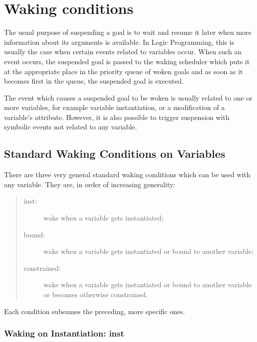 \section{Waking conditions}
The usual purpose of suspending a goal is to wait and resume it later
when more information about its arguments is available.
In Logic Programming, this is usually the case when certain events
related to variables occur.
When such an event occurs, the suspended goal is passed to the
waking scheduler which puts it at the appropriate place
in the priority queue of woken goals and as soon as it becomes
first in the queue, the suspended goal is executed.

The event which causes a suspended goal to be woken is usually
related to one or more variables, for example
variable instantiation, or a modification of a variable's
attribute.
However, it is also possible to trigger suspension with symbolic events
not related to any variable.


\subsection{Standard Waking Conditions on Variables}
\label{suspend}
\label{coroutining}%
There are three very general standard waking conditions which
can be used with any variable. They are, in order of increasing generality:
\begin{quote}
\begin{description}
\item[inst:] wake when a variable gets instantiated;
\item[bound:] wake when a variable gets instantiated or bound to
        another variable;
\item[constrained:] wake when a variable gets instantiated or bound to
        another variable or becomes otherwise constrained.
\end{description}
\end{quote}
Each condition subsumes the preceding, more specific ones.


\subsubsection{Waking on Instantiation: inst}

